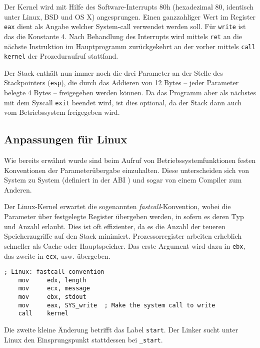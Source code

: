 Der Kernel wird mit Hilfe des Software-Interrupts 80h (hexadezimal 80, identisch unter Linux, BSD und OS X) angesprungen. Einen ganzzahliger Wert im Register \texttt{eax} dient als Angabe welcher System-call verwendet werden soll. Für {\tt write} ist das die Konstante 4. Nach Behandlung des Interrupts wird mittels \texttt{ret} an die nächste Instruktion im Hauptprogramm zurückgekehrt an der vorher mittels \texttt{call kernel} der Prozeduraufruf stattfand.

Der Stack enthält nun immer noch die drei Parameter an der Stelle des Stackpointers ({\tt esp}), die durch das Addieren von 12 Bytes -- jeder Parameter belegte 4 Bytes -- freigegeben werden können. Da das Programm aber als nächstes mit dem Syscall \texttt{exit} beendet wird, ist dies optional, da der Stack dann auch vom Betriebssystem freigegeben wird.


\subsection{Anpassungen für Linux}

Wie bereits erwähnt wurde sind beim Aufruf von Betriebssystemfunktionen festen Konventionen \cite{wp:callconv} der Parameterübergabe einzuhalten. Diese unterscheiden sich von System zu System (definiert in der ABI \cite{wp:abi}) und sogar von einem Compiler zum Anderen.

Der Linux-Kernel erwartet die sogenannten \emph{fastcall}-Konvention, wobei die Parameter über festgelegte Register übergeben werden, in sofern es deren Typ und Anzahl erlaubt. Dies ist oft effizienter, da es die Anzahl der teueren Speicherzugriffe auf den Stack minimiert. Prozessorregister arbeiten erheblich schneller als Cache oder Hauptspeicher. Das erste Argument wird dazu in {\tt ebx}, das zweite in {\tt ecx}, usw. übergeben.

\begin{lstlisting}[caption=Linux-Kernel Aufrufkonvention]
    ; Linux: fastcall convention
    mov     edx, length
    mov     ecx, message
    mov     ebx, stdout
    mov     eax, SYS_write  ; Make the system call to write
    call    kernel
\end{lstlisting}

Die zweite kleine Änderung betrifft das Label {\tt start}. Der Linker sucht unter Linux den Einsprungspunkt stattdessen bei {\tt \_start}.
